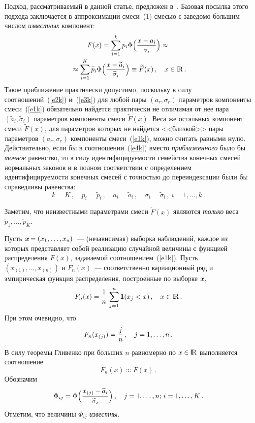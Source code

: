 \begin{multicols}{2}
Подход, рассматриваемый в данной статье, предложен в~\cite{1k}.
Базовая посылка этого подхода заключается в аппроксимации смеси~(1)
смесью с заведомо б$\acute{\mbox{о}}$льшим числом {\it известных}
компонент:
\begin{multline}
F(x)=\sum_{i=1}^kp_i\Phi\Big(\displaystyle\frac{\displaystyle x-a_i\mathstrut}{\displaystyle \sigma_i\mathstrut}\Big)\approx{}\\
{}\approx
\sum_{i=1}^K\widetilde p_i\Phi\Big(\displaystyle\frac{\displaystyle x-\widetilde
a_i\mathstrut}{\displaystyle \widetilde\sigma_i\mathstrut}\Big)\equiv \widetilde F(x)\,,\quad
x\in\rm I\hspace{-0.7mm}\rm R\,.
\label{e4k}
\end{multline}
Такое приближение практически допустимо,
поскольку в силу соотношений~(\ref{e2k}) и~(\ref{e3k}) для любой пары
$(a_r,\sigma_r)$ параметров компоненты смеси~(\ref{e1k}) обязательно
найдется практически не отличимая от нее пара $(\widetilde
a_i,\widetilde \sigma_i)$ параметров компоненты смеси $\widetilde
F(x)$. Веса же остальных компонент смеси $\widetilde F(x)$, для
параметров которых не найдется <<близкой>> пары параметров
$(a_r,\sigma_r)$ компоненты смеси~(\ref{e1k}), можно считать равными нулю.
Действительно, если бы в соотношении~(\ref{e4k}) вместо {\it
приближенного} было бы {\it точное} равенство, то в силу
идентифицируемости семейства конечных смесей нормальных законов и
в полном соответствии с определением идентифицируемости конечных
смесей с точностью до переиндексации были бы справедливы
равенства:
$$
k=K\,,\quad
 p_i=\widetilde p_i\,, \quad a_i=\widetilde a_i\,, \quad
 \sigma_i=\widetilde\sigma_i\,,\  i=1,\ldots,k\,.
$$

Заметим, что неизвестными параметрами смеси $\widetilde F(x)$
являются {\it только} веса $\widetilde p_1,\ldots,\widetilde p_K$.

Пусть $\emph{\textbf{x}} =(x_1,\ldots,x_n)$~--- (независимая)
выборка наблюдений, каждое из которых представляет собой
реализацию случайной величины с функцией распределения $F(x)$,
задаваемой соотношением~(\ref{e1k}). Пусть $(x_{(1)},\ldots,x_{(n)})$ и
$F_n(x)$~--- соответственно вариационный ряд и эмпирическая функция
распределения, построенные по выборке $\emph{\textbf{x}} $,
$$
F_n(x)=\displaystyle\frac{\displaystyle 1\mathstrut}{\displaystyle n\mathstrut}\,\sum_{j=1}^n{\bf 1}(x_j<x)\,,\quad  x\in\rm I\hspace{-0.7mm}\rm R\,.
$$
При
этом очевидно, что
\begin{equation}
F_n(x_{(j)})=\displaystyle\frac{\displaystyle j\mathstrut}{\displaystyle n\mathstrut}\,,\quad j=1,\ldots,n\,.
\label{e5k}
\end{equation}
В силу теоремы Гливенко при больших $n$
равномерно по $x\in\rm I\hspace{-0.7mm}\rm R$ выполняется соотношение
\begin{equation}
F_n(x)\approx   F(x)\,.\label{e6k}
\end{equation}
Обозначим
$$
\Phi_{ij}=\Phi\Big(\displaystyle\frac{\displaystyle x_{(j)}-\widetilde
a_i\mathstrut}{\displaystyle \widetilde\sigma_i\mathstrut}\Big)\,,\quad
j=1,\ldots,n;\,i=1,\ldots,K\,.
$$
Отметим, что величины $\Phi_{ij}$
{\it известны}.


\end{multicols}
